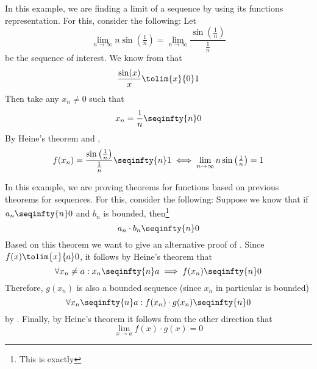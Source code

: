 \begin{exm}\label{exm-heine:2}
	In this example, we are finding a limit of a sequence by using its functions
	representation. For this, consider the following: Let
	\begin{equation}\label{eq-heine-find:1}
		\lim_{n\to\infty}n\sin\left(\tfrac{1}{n}\right)=\lim_{n\to\infty}\frac{\sin\left(\tfrac{1}{n}\right)}{\tfrac{1}{n}}
	\end{equation}
	be the sequence of interest. We know from  that
	\begin{equation}\label{eq-heine-find:2}
		\frac{\sin(x)}{x} \tolim{x}{0} 1
	\end{equation}
	Then take any $x_n\neq0$ such that
	\begin{equation}
		x_n=\frac{1}{n}\seqinfty{n}0
	\end{equation}
	By Heine's theorem and ,
	\begin{equation*}
		f(x_n)=\frac{\sin\left(\tfrac{1}{n}\right)}{\tfrac{1}{n}}\seqinfty{n}1
		\iff \lim_{n\to\infty}n\sin\left(\tfrac{1}{n}\right)=1
	\end{equation*}
\end{exm}

\begin{exm}\label{exm-heine:3}
	In this example, we are proving theorems for functions based on previous theorems
	for sequences. For this, consider the following: Suppose we know that if
	$a_n \seqinfty{n} 0$ and $b_n$ is bounded, then\footnote{This is exactly
		}
	\begin{equation*}
		a_n \cdot b_n \seqinfty{n} 0
	\end{equation*}
	Based on this theorem we want to give an alternative proof of
	. Since $f(x)\tolim{x}{a}0$,
	it follows by Heine's theorem that
	\begin{equation*}
		\forall x_n\neq a: x_n \seqinfty{n} a \implies f(x_n) \seqinfty{n} 0
	\end{equation*}
	Therefore, $g(x_n)$ is also a bounded sequence (since $x_n$ in particular is
	bounded)
	\begin{equation*}
		\forall x_n\seqinfty{n}a: f(x_n) \cdot g(x_n) \seqinfty{n} 0
	\end{equation*}
	by . Finally, by Heine's
	theorem it follows from the other direction that
	\begin{equation*}
		\lim_{x \to a} f(x) \cdot g(x) = 0
	\end{equation*}
\end{exm}
